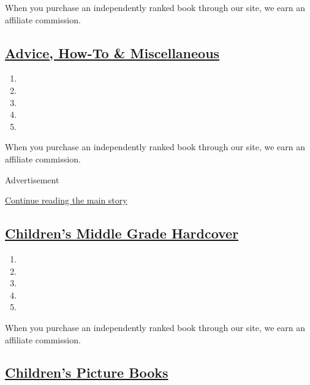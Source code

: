 When you purchase an independently ranked book through our site, we earn
an affiliate commission.

\hypertarget{advice-how-to--miscellaneous}{%
\subsection{\texorpdfstring{\href{/books/best-sellers/advice-how-to-and-miscellaneous/}{Advice,
How-To \&
Miscellaneous}}{Advice, How-To \& Miscellaneous}}\label{advice-how-to--miscellaneous}}

\begin{enumerate}
\def\labelenumi{\arabic{enumi}.}
\tightlist
\item
\item
\item
\item
\item
\end{enumerate}

When you purchase an independently ranked book through our site, we earn
an affiliate commission.

Advertisement

\protect\hyperlink{after-mid2}{Continue reading the main story}

\hypertarget{childrens-middle-grade-hardcover}{%
\subsection{\texorpdfstring{\href{/books/best-sellers/childrens-middle-grade-hardcover/}{Children's
Middle Grade
Hardcover}}{Children's Middle Grade Hardcover}}\label{childrens-middle-grade-hardcover}}

\begin{enumerate}
\def\labelenumi{\arabic{enumi}.}
\tightlist
\item
\item
\item
\item
\item
\end{enumerate}

When you purchase an independently ranked book through our site, we earn
an affiliate commission.

\hypertarget{childrens-picture-books}{%
\subsection{\texorpdfstring{\href{/books/best-sellers/picture-books/}{Children's
Picture
Books}}{Children's Picture Books}}\label{childrens-picture-books}}

